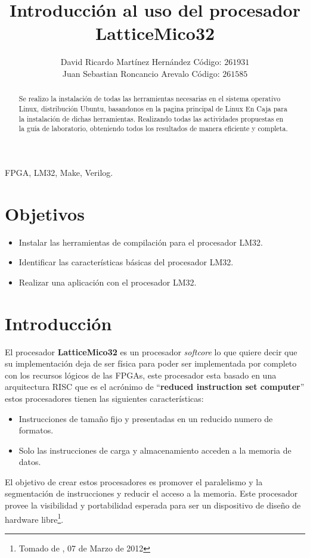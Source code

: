 \documentclass[twocolumn]{IEEEtran}
\begin{document}
\title{Introducción al uso del procesador LatticeMico32}
\author{David Ricardo Martínez Hernández Código: $261931$\\
	Juan Sebastian Roncancio Arevalo Código: $261585$}
\maketitle
{}
\begin{keywords}
 FPGA, LM32, Make, Verilog.
\end{keywords}
\begin{abstract}
Se realizo la instalación de todas las herramientas necesarias en el sistema operativo Linux, distribución Ubuntu, basandonos en la pagina principal de Linux En Caja para la instalación de dichas herramientas. Realizando todas las actividades propuestas en la guía de laboratorio, obteniendo todos los resultados de manera eficiente y completa.
\end{abstract}

\section{Objetivos}
\begin{itemize}
 \item Instalar las herramientas de compilación para el procesador LM32.
 \item Identificar las características básicas del procesador LM32.
 \item Realizar una aplicación con el procesador LM32.
\end{itemize}

\section{Introducción}
\noindent
El procesador \textbf{LatticeMico32} es un procesador \textit{softcore} lo que quiere decir que su implementación deja de ser física para poder ser implementada por completo con los recursos lógicos de las FPGAs, este procesador esta basado en una arquitectura RISC que es el acrónimo de ``\textbf{reduced instruction set computer}'' estos procesadores tienen las siguientes características:
\begin{itemize}
 \item Instrucciones de tamaño fijo y presentadas en un reducido numero de formatos.
 \item Solo las instrucciones de carga y almacenamiento acceden a la memoria de  datos.
\end{itemize}
\noindent
El objetivo de crear estos procesadores es promover el paralelismo y la  segmentación de instrucciones y reducir el acceso a la memoria. Este procesador provee la visibilidad y portabilidad esperada para ser un dispositivo de diseño de hardware libre\footnote{Tomado de \cite{page1}, 07 de Marzo de 2012}.
\end{document}

